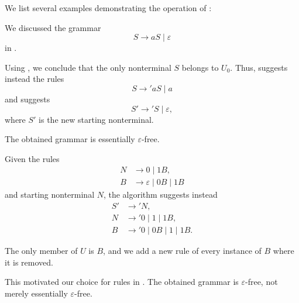 \begin{example}\label{ex:alg:epsilon_rule_removal}
  We list several examples demonstrating the operation of :
  \begin{thmenum}
     We discussed the grammar
    \begin{equation*}
      S \to aS \mid \varepsilon
    \end{equation*}
    in .

    Using , we conclude that the only nonterminal \( S \) belongs to \( U_0 \). Thus,  suggests instead the rules
    \begin{equation*}
      S \to' aS \mid a
    \end{equation*}
    and  suggests
    \begin{equation*}
      S' \to' S \mid \varepsilon,
    \end{equation*}
    where \( S' \) is the new starting nonterminal.

    The obtained grammar is essentially \( \varepsilon \)-free.

     Given the rules
    \begin{equation*}
      \begin{aligned}
        N &\to 0 \mid 1 B, \\
        B &\to \varepsilon \mid 0 B \mid 1 B
      \end{aligned}
    \end{equation*}
    and starting nonterminal \( N \), the algorithm suggests instead
    \begin{equation*}
      \begin{aligned}
        S' &\to' N, \\
        N  &\to' 0 \mid 1 \mid 1 B, \\
        B  &\to' 0 \mid 0 B \mid 1 \mid 1 B.
      \end{aligned}
    \end{equation*}

    The only member of \( U \) is \( B \), and we add a new rule of every instance of \( B \) where it is removed.

    This motivated our choice for rules in . The obtained grammar is \( \varepsilon \)-free, not merely essentially \( \varepsilon \)-free.


\end{thmenum}
\end{example}
